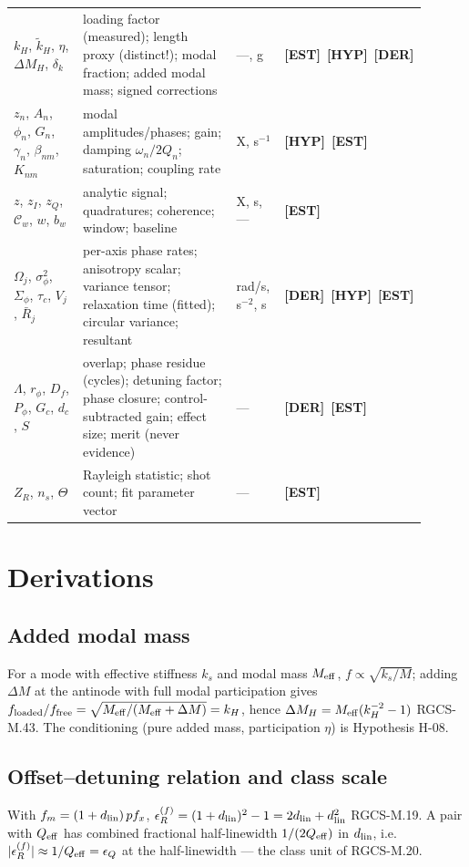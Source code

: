 \documentclass[10pt,letterpaper]{article}
\newcommand{\cltag}[2]{\textcolor{#1}{{\fontspec{TeX Gyre Heros}\scriptsize\bfseries[#2]}}}
\newcommand{\EST}{\cltag{estcol}{EST}}   %
\newcommand{\DER}{\cltag{dercol}{DER}}   %
\newcommand{\HYP}{\cltag{hypcol}{HYP}}   %
\newcommand{\eqid}[1]{\textcolor{inkgray}{\scriptsize\textsf{#1}}}
\newcommand{\epsR}{\epsilon_{R}^{(f)}}
\newcommand{\Cw}{\mathcal{C}_{w}}
\begin{document}
\begin{longtable}{@{}p{0.22\linewidth} p{0.44\linewidth} p{0.12\linewidth} p{0.12\linewidth}@{}}
$k_H$, $\tilde k_H$, $\eta$, $\Delta M_H$, $\delta_k$ & loading factor (measured); length proxy (distinct!); modal fraction; added modal mass; signed corrections & —, g & \EST\ \HYP\ \DER \\
$z_n$, $A_n$, $\phi_n$, $G_n$, $\gamma_n$, $\beta_{nm}$, $K_{nm}$ & modal amplitudes/phases; gain; damping $\omega_n/2Q_n$; saturation; coupling rate & X, s$^{-1}$ & \HYP\ \EST \\
$z$, $z_I$, $z_Q$, $\Cw$, $w$, $b_w$ & analytic signal; quadratures; coherence; window; baseline & X, s, — & \EST \\
$\Omega_j$, $\sigma_\phi^2$, $\Sigma_\phi$, $\tau_c$, $V_j$, $\bar R_j$ & per-axis phase rates; anisotropy scalar; variance tensor; relaxation time (fitted); circular variance; resultant & rad/s, s$^{-2}$, s & \DER\ \HYP\ \EST \\
$\Lambda$, $r_\phi$, $D_f$, $P_\phi$, $G_c$, $d_c$, $S$ & overlap; phase residue (cycles); detuning factor; phase closure; control-subtracted gain; effect size; merit (never evidence) & — & \DER\ \EST \\
$Z_R$, $n_s$, $\Theta$ & Rayleigh statistic; shot count; fit parameter vector & — & \EST \\
\bottomrule
\end{longtable}

\section{Derivations}\label{app:derivations}

\subsection{Added modal mass}
For a mode with effective stiffness $k_s$ and modal mass $M_{\rm eff}$,
$f \propto \sqrt{k_s/M}$; adding $\Delta M$ at the antinode with full
modal participation gives $f_{\rm loaded}/f_{\rm free} =
\sqrt{M_{\rm eff}/(M_{\rm eff} + \Delta M)} = k_H$, hence
$\Delta M_H = M_{\rm eff}(k_H^{-2} - 1)$ \eqid{RGCS-M.43}. The
conditioning (pure added mass, participation $\eta$) is Hypothesis H-08.

\subsection{Offset--detuning relation and class scale}
With $f_m = (1 + d_{\rm lin})\, p f_x$,
$\epsR = (1 + d_{\rm lin})^2 - 1 = 2 d_{\rm lin} + d_{\rm lin}^2$
\eqid{RGCS-M.19}. A pair with $Q_{\rm eff}$ has combined fractional
half-linewidth $1/(2 Q_{\rm eff})$ in $d_{\rm lin}$, i.e.\
$|\epsR| \approx 1/Q_{\rm eff} = \epsilon_Q$ at the half-linewidth —
the class unit of RGCS-M.20.
\end{document}
